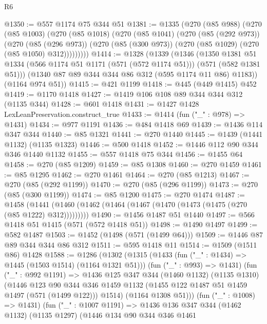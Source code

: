 \begin{lexlean}{R6}
\begin{coremodule}
@1350 := @557 @1174 @75 @344 @51
@1381 := @1335
    (@270
      (@85 @988)
      (@270
        (@85 @1003)
        (@270
          (@85 @1018)
          (@270
            (@85 @1041)
            (@270
              (@85 (@292 @973))
              (@270
                (@85 (@296 @973))
                (@270 (@85 (@300 @973)) (@270 (@85 @1029) (@270 (@85 @1050) @312)))))))))
@1414 := @1328
    (@1339
      (@1346
        (@1350
          @1381
          @51
          @1334
          (@566 @1174 @51 @1171 (@571 (@572 @1174 @51)))
          (@571 (@582 @1381 @51)))
        (@1340 @87 @89 @344 @344 @86 @312 (@595 @1174 @11 @86) @1183))
      (@1164 @974 @51))
@1415 := @421 @1199
@1418 := @445 (@449 @1415) @452
@1419 := @1170 @1418
@1427 := @1419 @106 @108 @89 @344 @344 @312 (@1135 @344)
@1428 := @601 @1418
@1431 := @1427 @1428 LexLeanPreservation.construct_true
@1433 := @1414 (fun ("_" : @978) => @1431)
@1434 := @977 @1191
@1436 := @484 @1418 @69
@1439 := @1436 @114 @347 @344
@1440 := @85 @1321
@1441 := @270 @1440
@1445 := @1439 (@1441 @1132) (@1135 @1323)
@1446 := @500 @1418
@1452 := @1446 @112 @90 @344 @346 @1440 @1132
@1455 := @557 @1418 @75 @344
@1456 := @1455 @64
@1458 := @270 (@85 @1209)
@1459 := @85 @1308
@1460 := @270 @1459
@1461 := @85 @1295
@1462 := @270 @1461
@1464 := @270 (@85 @1213)
@1467 := @270 (@85 (@292 @1199))
@1470 := @270 (@85 (@296 @1199))
@1473 := @270 (@85 (@300 @1199))
@1474 := @85 @1200
@1475 := @270 @1474
@1487 := @1458
    (@1441 (@1460 (@1462 (@1464 (@1467 (@1470 (@1473 (@1475 (@270 (@85 @1222) @312)))))))))
@1490 := @1456 @1487 @51 @1440
@1497 := @566 @1418 @51 @1415 (@571 (@572 @1418 @51))
@1498 := @1490 @1497
@1499 := @582 @1487
@1503 := @1452 (@1498 (@571 (@1499 @64)))
@1509 := @1446 @87 @89 @344 @344 @86 @312
@1511 := @595 @1418 @11
@1514 := @1509 (@1511 @86) @1428
@1588 := @1286
    (@1302
      (@1315
        (@1433 (fun ("_" : @1434) => @1445 (@1503 @1514) (@1164 @1321 @51)))
        (fun ("_" : @993) => @1431)
        (fun ("_" : @992 @1191) =>
        @1436
          @125
          @347
          @344
          (@1460 @1132)
          (@1135 @1310)
          (@1446
            @123
            @90
            @344
            @346
            @1459
            @1132
            (@1455 @122 @1487 @51 @1459 @1497 (@571 (@1499 @122)))
            @1514)
          (@1164 @1308 @51)))
      (fun ("_" : @1008) => @1431)
      (fun ("_" : @1007 @1191) =>
      @1436
        @136
        @347
        @344
        (@1462 @1132)
        (@1135 @1297)
        (@1446
          @134
          @90
          @344
          @346
          @1461

\end{coremodule}
\end{lexlean}
